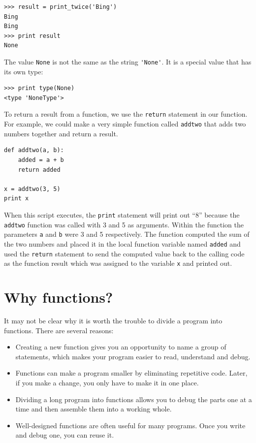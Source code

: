 \documentclass[10pt]{book}
\begin{document}

\beforeverb
\begin{verbatim}
>>> result = print_twice('Bing')
Bing
Bing
>>> print result
None
\end{verbatim}
\afterverb
%
The value {\tt None} is not the same as the string \verb"'None'". 
It is a special value that has its own type:

\beforeverb
\begin{verbatim}
>>> print type(None)
<type 'NoneType'>
\end{verbatim}
\afterverb
%
To return a result from a function, we use the {\tt return} statement 
in our function.  For example, we could make a very 
simple function called {\tt addtwo}
that adds two numbers together and return a result.

\beforeverb
\begin{verbatim}
def addtwo(a, b):
    added = a + b
    return added

x = addtwo(3, 5)
print x
\end{verbatim}
\afterverb
%
When this script executes, the {\tt print} statement will print out ``8''
because the {\tt addtwo} function was called with 3 and 5 as arguments.
Within the function the parameters {\tt a} and {\tt b} were 3 and 5 
respectively. The function computed the sum of the two numbers and placed
it in the local function variable named {\tt added} 
and used the {\tt return} statement 
to send the computed value back to the calling code 
as the function result which was assigned
to the variable {\tt x} and printed out.


\section{Why functions?}

It may not be clear why it is worth the trouble to divide
a program into functions.  There are several reasons:

\begin{itemize}

\item Creating a new function gives you an opportunity to name a group
of statements, which makes your program easier to read, understand 
and debug.

\item Functions can make a program smaller by eliminating repetitive
code.  Later, if you make a change, you only have
to make it in one place.

\item Dividing a long program into functions allows you to debug the
parts one at a time and then assemble them into a working whole.

\item Well-designed functions are often useful for many programs.
Once you write and debug one, you can reuse it.

\end{itemize}
\end{document}
